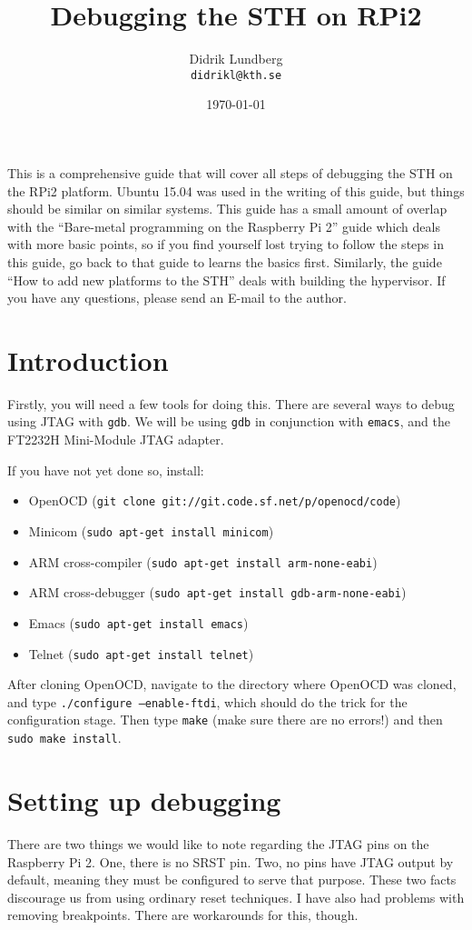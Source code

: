 \documentclass[a4paper,11pt,reqno]{amsart}
\title{Debugging the STH on RPi2}
\author{Didrik Lundberg\\
\texttt{didrikl@kth.se}}
\date{\today}
\begin{document}
\maketitle
\noindent
This is a comprehensive guide that will cover all steps of debugging the STH on the RPi2 platform. Ubuntu 15.04 was used in the writing of this guide, but things should be similar on similar systems. This guide has a small amount of overlap with the ``Bare-metal programming on the Raspberry Pi 2'' guide which deals with more basic points, so if you find yourself lost trying to follow the steps in this guide, go back to that guide to learns the basics first. Similarly, the guide ``How to add new platforms to the STH'' deals with building the hypervisor. If you have any questions, please send an E-mail to the author.

\section{Introduction}
\noindent
Firstly, you will need a few tools for doing this. There are several ways to debug using JTAG with \texttt{gdb}. We will be using \texttt{gdb} in conjunction with \texttt{emacs}, and the FT2232H Mini-Module JTAG adapter.

If you have not yet done so, install:

\begin{itemize}
\item OpenOCD (\texttt{git clone git://git.code.sf.net/p/openocd/code})
\item Minicom (\texttt{sudo apt-get install minicom})
\item ARM cross-compiler (\texttt{sudo apt-get install arm-none-eabi})
\item ARM cross-debugger (\texttt{sudo apt-get install gdb-arm-none-eabi})
\item Emacs (\texttt{sudo apt-get install emacs})
\item Telnet (\texttt{sudo apt-get install telnet})
\end{itemize}

After cloning OpenOCD, navigate to the directory where OpenOCD was cloned, and type \texttt{./configure --enable-ftdi}, which should do the trick for the configuration stage. Then type \texttt{make} (make sure there are no errors!) and then \texttt{sudo make install}.

\section{Setting up debugging}
\noindent
There are two things we would like to note regarding the JTAG pins on the Raspberry Pi 2. One, there is no SRST pin. Two, no pins have JTAG output by default, meaning they must be configured to serve that purpose. These two facts discourage us from using ordinary reset techniques. I have also had problems with removing breakpoints. There are workarounds for this, though.
\end{document}
